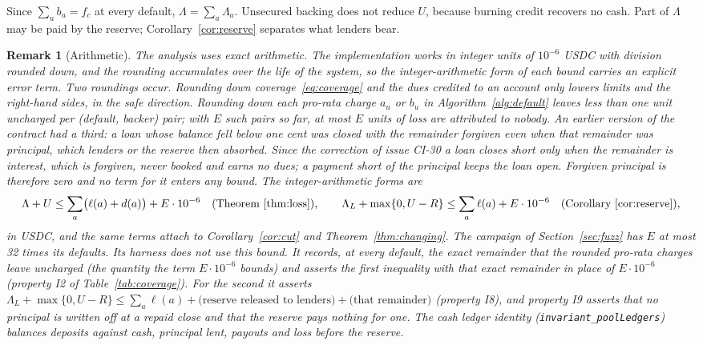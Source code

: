 \documentclass[acmsmall,nonacm,screen]{acmart}
\theoremstyle{acmdefinition}%
\newtheorem{remark}[theorem]{Remark}}
\begin{document}
Since $\sum_u b_u=f_c$ at every default, $\Lambda=\sum_a\Lambda_a$. Unsecured backing does not
reduce $U$, because burning credit recovers no cash. Part of $\Lambda$ may be paid by the reserve;
Corollary~\ref{cor:reserve} separates what lenders bear.

\begin{remark}[Arithmetic]\label{rem:arithmetic}
The analysis uses exact arithmetic. The implementation works in integer units of $10^{-6}$ USDC
with division rounded down, and the rounding accumulates over the life of the system, so the
integer-arithmetic form of each bound carries an explicit error term. Two roundings occur.
Rounding down coverage~\eqref{eq:coverage} and the dues credited to an account only lowers limits
and the right-hand sides, in the safe direction. Rounding down each pro-rata charge $a_u$ or $b_u$ in
Algorithm~\ref{alg:default} leaves less than one unit uncharged per (default, backer) pair; with $E$
such pairs so far, at most $E$ units of loss are attributed to nobody. An earlier version of the
contract had a third: a loan whose balance fell below one cent was closed with the remainder
forgiven even when that remainder was principal, which lenders or the reserve then absorbed. Since the
correction of issue CI-30 a loan closes short only when the remainder is interest, which is
forgiven, never booked and earns no dues; a payment short of the principal keeps the loan open.
Forgiven principal is therefore zero and no term for it enters any bound. The integer-arithmetic
forms are
\[
  \Lambda+U\le\sum_a\bigl(\ell(a)+d(a)\bigr)+E\cdot10^{-6}\quad\text{(Theorem~\ref{thm:loss})},\qquad
  \Lambda_L+\max\{0,U-R\}\le\sum_a\ell(a)+E\cdot10^{-6}\quad\text{(Corollary~\ref{cor:reserve})},
\]
in USDC, and the same terms attach to Corollary~\ref{cor:cut} and Theorem~\ref{thm:changing}. The
campaign of Section~\ref{sec:fuzz} has $E$ at most 32 times its \FuzzDefaults{} defaults. Its harness
does not use this bound. It records, at every default, the exact remainder that the rounded
pro-rata charges leave uncharged (the quantity the term $E\cdot10^{-6}$ bounds) and asserts the first
inequality with that exact remainder in place of $E\cdot10^{-6}$ (property I2 of
Table~\ref{tab:coverage}). For the second it asserts
$\Lambda_L+\max\{0,U-R\}\le\sum_a\ell(a)+\text{(reserve released to lenders)}+\text{(that remainder)}$
(property I8), and property I9 asserts that no principal is written off at a repaid close and that the
reserve pays nothing for one. The cash ledger identity (\texttt{invariant\_poolLedgers}) balances
deposits against cash, principal lent, payouts and loss before the reserve.
\end{remark}
\end{document}
